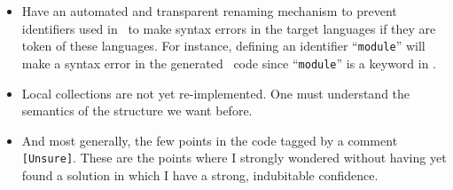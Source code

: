 \begin{itemize}
\item Have an automated and transparent renaming mechanism to prevent
  identifiers used in \focalize\ to make syntax errors in the target
  languages if they are token of these languages. For instance,
  defining an identifier ``{\tt module}'' will make a syntax error in
  the generated \ocaml\ code since ``{\tt module}'' is a keyword in
  \ocaml.

\item Local collections are not yet re-implemented. One must
  understand the semantics of the structure we want before.

\item And most generally, the few points in the code tagged by a
  comment  {\tt [Unsure]}. These are the points where I strongly
  wondered without having yet found a solution in which I have a
  strong, indubitable confidence.
\end{itemize}
